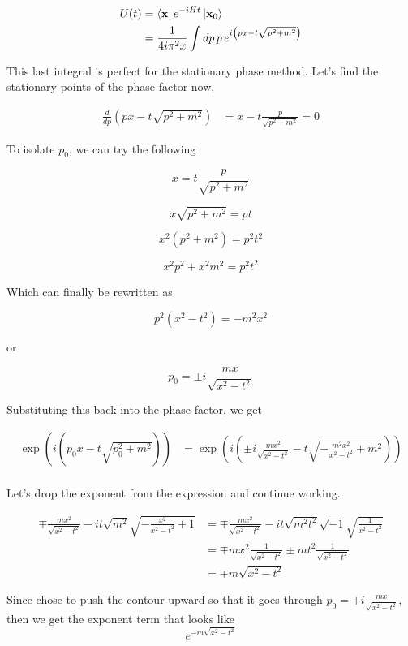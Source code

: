 \begin{align}
U(t) &= \bra{\boldsymbol{\mathbf{x}}} e^{-iHt} \ket{\boldsymbol{\mathbf{x}}_0} \\
&= \frac{1}{4i \pi^2 x}
    \int dp \, p \, e^{i \left(px - t\sqrt{p^2 + m^2}\right)}
\end{align}

This last integral is perfect for the stationary phase method.
Let's find the stationary points of the phase factor now,

\begin{align*}
\frac{d}{dp} \left( px - t\sqrt{p^2 + m^2} \right) &= x - t\frac{p}{\sqrt{p^2 + m^2}} = 0
\end{align*}

To isolate $p_0$, we can try the following

$$
x = t\frac{p}{\sqrt{p^2 + m^2}}
$$

$$
x \sqrt{p^2 + m^2} = pt
$$

$$
x^2 \left( p^2 + m^2 \right) = p^2 t^2
$$

$$
x^2 p^2 + x^2 m^2 = p^2 t^2
$$

Which can finally be rewritten as

$$
p^2 \left(x^2 - t^2 \right) = -m^2 x^2
$$

or

$$
p_0 = \pm i \frac{mx}{ \sqrt{ x^2 - t^2 } }
$$


Substituting this back into the phase factor, we get

\begin{align*}
\exp\left( i \left(p_0 x - t\sqrt{p_{0}^{2} + m^2}\right) \right) &=
    \exp\left( i \left(\pm i \frac{mx^2}{ \sqrt{ x^2 - t^2 } } 
        - t\sqrt{-\frac{m^2 x^2}{x^2 - t^2} + m^2}\right) \right) \\
\end{align*}

Let's drop the exponent from the expression and continue working.

\begin{align*}
\mp \frac{mx^2}{ \sqrt{ x^2 - t^2 } }
    - i t \sqrt{m^2} \sqrt{-\frac{x^2}{x^2 - t^2} + 1}
&= \mp \frac{mx^2}{ \sqrt{ x^2 - t^2 } }
    - i t \sqrt{m^2 t^2} \sqrt{-1} \sqrt{ \frac{1}{x^2 - t^2} } \\
&= \mp m x^2 \frac{1}{ \sqrt{ x^2 - t^2 } }
    \pm m t^2 \frac{1}{ \sqrt{ x^2 - t^2 } } \\
&= \mp m \sqrt{x^2 - t^2}
\end{align*}


Since \cite{peskin-and-schroeder} chose to push the contour upward so that it goes through
$p_0 = + i \frac{mx}{ \sqrt{ x^2 - t^2 } } $, then we get the exponent term that looks like
$$
e^{- m \sqrt{x^2 - t^2}}
$$


